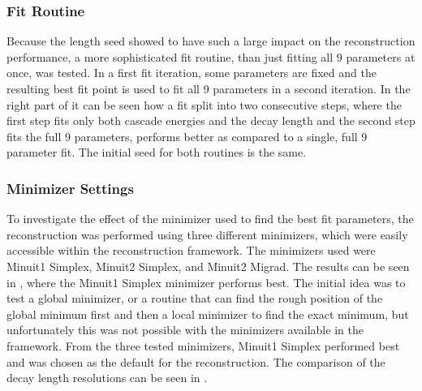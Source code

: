 \subsubsection{Fit Routine}

Because the length seed showed to have such a large impact on the reconstruction performance, a more sophisticated fit routine, than just fitting all 9 parameters at once, was tested. In a first fit iteration, some parameters are fixed and the resulting best fit point is used to fit all 9 parameters in a second iteration. In the right part of  it can be seen how a fit split into two consecutive steps, where the first step fits only both cascade energies and the decay length and the second step fits the full 9 parameters, performs better as compared to a single, full 9 parameter fit. The initial seed for both routines is the same.


\subsubsection{Minimizer Settings}

To investigate the effect of the minimizer used to find the best fit parameters, the reconstruction was performed using three different minimizers, which were easily accessible within the reconstruction framework. The minimizers used were Minuit1 Simplex, Minuit2 Simplex, and Minuit2 Migrad. The results can be seen in , where the Minuit1 Simplex minimizer performs best. The initial idea was to test a global minimizer, or a routine that can find the rough position of the global minimum first and then a local minimizer to find the exact minimum, but unfortunately this was not possible with the minimizers available in the framework. From the three tested minimizers, Minuit1 Simplex performed best and was chosen as the default for the reconstruction. The comparison of the decay length resolutions can be seen in .


